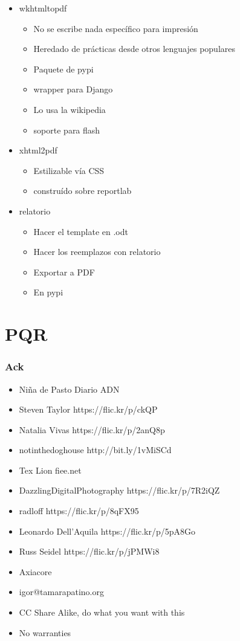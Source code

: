 \documentclass[8pt,xcolor={usenames,dvipsnames}]{beamer}
\begin{document}
\begin{frame}
  \begin{itemize}
  \item wkhtmltopdf
    \begin{itemize}
      \item No se escribe nada específico para impresión
      \item Heredado de prácticas desde otros lenguajes populares
      \item Paquete de pypi
      \item wrapper para Django
      \item Lo usa la wikipedia
      \item soporte para flash
    \end{itemize}
  \item xhtml2pdf
    \begin{itemize}
    \item Estilizable vía CSS
    \item construído sobre reportlab
    \end{itemize}
  \item relatorio
    \begin{itemize}
    \item Hacer el template en .odt
    \item Hacer los reemplazos con relatorio
    \item Exportar a PDF
    \item En pypi
    \end{itemize}
  \end{itemize}

\end{frame}


\section{PQR}

\begin{frame}
\frametitle{Ack}
  \begin{itemize}
  \item Niña de Pasto Diario ADN
  \item Steven Taylor https://flic.kr/p/ckQP
  \item Natalia Vivas https://flic.kr/p/2anQ8p
  \item notinthedoghouse http://bit.ly/1vMiSCd
  \item Tex Lion fiee.net
  \item DazzlingDigitalPhotography https://flic.kr/p/7R2iQZ
  \item radloff https://flic.kr/p/8qFX95
  \item Leonardo Dell'Aquila https://flic.kr/p/5pA8Go
  \item Russ Seidel https://flic.kr/p/jPMWi8
  \item Axiacore
  \item igor@tamarapatino.org
  \item CC Share Alike, do what you want with this
  \item No warranties
  \end{itemize}
\end{frame}
\end{document}
